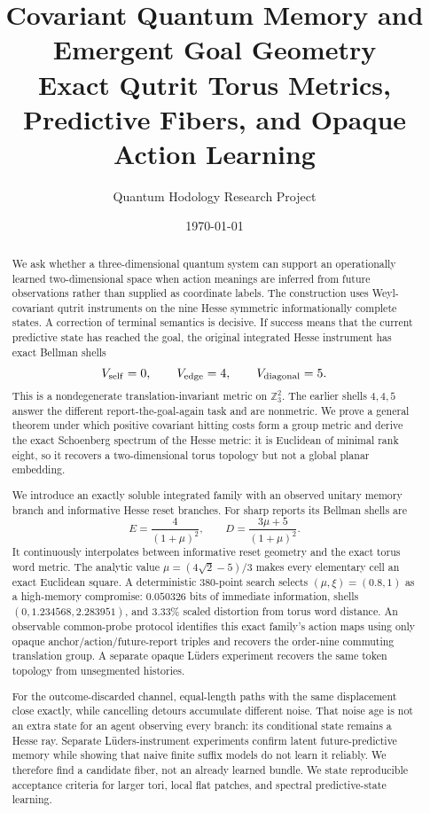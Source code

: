\documentclass[11pt]{article}
\title{\textbf{Covariant Quantum Memory and Emergent Goal Geometry}\\
\large Exact Qutrit Torus Metrics, Predictive Fibers, and Opaque Action Learning}
\author{Quantum Hodology Research Project}
\date{\today}
\theoremstyle{definition}
\theoremstyle{remark}
\newcommand{\Z}{\mathbb Z}
\begin{document}
\maketitle

\begin{abstract}
We ask whether a three-dimensional quantum system can support an
operationally learned two-dimensional space when action meanings are inferred
from future observations rather than supplied as coordinate labels. The
construction uses Weyl-covariant qutrit instruments on the nine Hesse
symmetric informationally complete states. A correction of terminal semantics
is decisive. If success means that the current predictive state has reached
the goal, the original integrated Hesse instrument has exact Bellman shells
\[
V_{\rm self}=0,\qquad V_{\rm edge}=4,\qquad V_{\rm diagonal}=5.
\]
This is a nondegenerate translation-invariant metric on \(\Z_3^2\). The
earlier shells \(4,4,5\) answer the different report-the-goal-again task and
are nonmetric. We prove a general theorem under which positive covariant
hitting costs form a group metric and derive the exact Schoenberg spectrum of
the Hesse metric: it is Euclidean of minimal rank eight, so it recovers a
two-dimensional torus topology but not a global planar embedding.

We introduce an exactly soluble integrated family with an observed unitary
memory branch and informative Hesse reset branches. For sharp reports its
Bellman shells are
\[
E=\frac4{(1+\mu)^2},\qquad
D=\frac{3\mu+5}{(1+\mu)^2}.
\]
It continuously interpolates between informative reset geometry and the
exact torus word metric. The analytic value
\(\mu=(4\sqrt2-5)/3\) makes every elementary cell an exact Euclidean square.
A deterministic 380-point search selects \((\mu,\xi)=(0.8,1)\) as a
high-memory compromise: \(0.050326\) bits of immediate information, shells
\((0,1.234568,2.283951)\), and \(3.33\%\) scaled distortion from torus word
distance. An observable common-probe protocol identifies this exact family's
action maps using only opaque anchor/action/future-report triples and recovers
the order-nine commuting translation group. A separate opaque Lüders
experiment recovers the same token topology from unsegmented histories.

For the outcome-discarded channel, equal-length paths with the same displacement
close exactly, while cancelling detours accumulate different noise. That noise
age is not an extra state for an agent observing every branch: its conditional
state remains a Hesse ray. Separate Lüders-instrument experiments confirm
latent future-predictive memory while showing that naive finite suffix models
do not learn it reliably. We therefore find a candidate fiber, not an already
learned bundle. We state
reproducible acceptance criteria for larger tori, local flat patches, and
spectral predictive-state learning.
\end{abstract}
\tableofcontents
\end{document}
